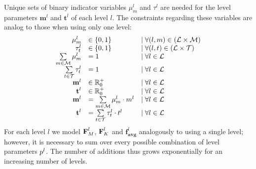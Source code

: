 \documentclass[a4paper,titlepage,onecolumn,oneside,12pt,nenglish,titlepage=firstiscover]{scrbook}
\theoremstyle{plain} %
\theoremstyle{definition} %
\theoremstyle{remark} %
\theoremstyle{plain}
\newcommand{\RR}{\mathbb{R}} %
\newcommand{\minimizerLength}{m}
\newcommand{\threshold}{t}
\newcommand{\level}{l}
\newcommand{\varAverageFrequency}{\textbf{f}_{\textbf{avg}}}
\newcommand{\possibleMinimizerLengths}{\mathcal{M}}
\newcommand{\possibleThresholds}{\mathcal{T}}
\newcommand{\indicatorm}{\mu}
\newcommand{\indicatort}{\tau}
\newcommand{\varMinimizerLength}{\textbf{\minimizerLength}}
\newcommand{\varThreshold}{\textbf{\threshold}}
\begin{document}
Unique sets of binary indicator variables $\indicatorm^\level_\minimizerLength$ and $\indicatort^\level$ are needed for the level parameters $\varMinimizerLength^\level$ and $\varThreshold^\level$ of each level $\level$.
The constraints regarding these variables are analog to those when using only one level:
\[ \begin{array}{rll}
	\indicatorm_\minimizerLength^\level &\in \{0,1\} & \mid \forall (\level,\minimizerLength) \in (\setOfLevels \times \possibleMinimizerLengths) \\
	\indicatort_\threshold^\level &\in \{0,1\} & \mid \forall (\level,\threshold) \in (\setOfLevels \times \possibleThresholds) \\
	\sum\limits_{m \in \possibleMinimizerLengths} \indicatorm_\minimizerLength^\level &= 1 & \mid \forall l \in \setOfLevels\\
	\sum\limits_{t \in \possibleThresholds} \indicatort_\threshold^\level &= 1 & \mid \forall l \in \setOfLevels\\
	\varMinimizerLength^\level &\in \RR^+_0 & \mid \forall l \in \setOfLevels\\
	\varThreshold^\level &\in \RR^+_0 & \mid \forall l \in \setOfLevels\\
	\varMinimizerLength^\level &= \sum\limits_{m \in \possibleMinimizerLengths} \indicatorm_\minimizerLength^\level \cdot \minimizerLength^\level & \mid \forall l \in \setOfLevels \\
	\varThreshold^\level &= \sum\limits_{t \in \possibleThresholds} \indicatort_\threshold^\level \cdot \threshold^\level & \mid \forall l \in \setOfLevels
\end{array} \]
For each level $l$ we model $\varCDF{M}^\level$, $\varCDF{K}^\level$ and $\varAverageFrequency^\level$ analogously to using a single level; however, it is necessary to sum over every possible combination of level parameters $\levelParameters{\level}$. The number of additions thus grows exponentially for an increasing number of levels.
\end{document}
